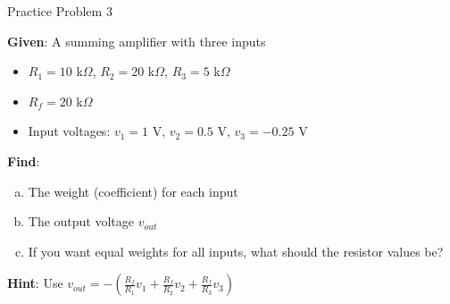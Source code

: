 \documentclass[10pt, aspectratio=169]{beamer}
\newif\ifshowsolutions
\begin{document}
\begin{frame}{Practice Problem 3}
    
    \textbf{Given}: A summing amplifier with three inputs
    \begin{itemize}
        \item $R_1 = 10$ k$\Omega$, $R_2 = 20$ k$\Omega$, $R_3 = 5$ k$\Omega$
        \item $R_f = 20$ k$\Omega$
        \item Input voltages: $v_1 = 1$ V, $v_2 = 0.5$ V, $v_3 = -0.25$ V
    \end{itemize}
    
    \vspace{0.3cm}
    
    \textbf{Find}:
    \begin{enumerate}[(a)]
        \item The weight (coefficient) for each input
        \item The output voltage $v_{out}$
        \item If you want equal weights for all inputs, what should the resistor values be?
    \end{enumerate}
    
    \vspace{0.5cm}
    
    \textbf{Hint}: Use $v_{out} = -\left(\frac{R_f}{R_1}v_1 + \frac{R_f}{R_2}v_2 + \frac{R_f}{R_3}v_3\right)$
    
\end{frame}

\ifshowsolutions
\begin{frame}{Practice Problem 3 Solution}
    
    \textbf{Given}: $R_f = 20$ k$\Omega$, $R_1 = 10$ k$\Omega$, $R_2 = 20$ k$\Omega$, $R_3 = 5$ k$\Omega$
    
    \textbf{Inputs}:  $v_1 = 1$ V, $v_2 = 0.5$ V, $v_3 = -0.25$ V
    
    \vspace{0.3cm}
    
    \textbf{Solutions}:
    
    (a) Weights:
    \[
    w_1 = \frac{R_f}{R_1} = \frac{20}{10} = \boxed{2}
    \]
    \[
    w_2 = \frac{R_f}{R_2} = \frac{20}{20} = \boxed{1}
    \]
    \[
    w_3 = \frac{R_f}{R_3} = \frac{20}{5} = \boxed{4}
    \]
    
    (b) Output voltage:
    \[
    v_{out} = -(2 \times 1 + 1 \times 0.5 + 4 \times (-0.25))
    \]
    \[
    v_{out} = -(2 + 0.5 - 1) = \boxed{-1.5 \text{ V}}
    \]
    
    (c) For equal weights:  $R_1 = R_2 = R_3 = R$ 
    
\end{frame}
\fi
\end{document}
